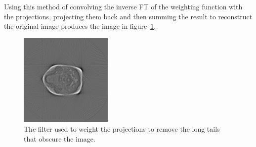         Using this method of convolving the inverse FT of the weighting function with the projections, projecting them back and then summing the result to reconstruct the original image produces the image in figure~\ref{fig:filtered_backprojection}.
        \begin{figure}[ht]
            \centering
                \includegraphics[width=0.4\textwidth]{Files/report_images/reconstructed_image.jpg}
            \caption{The filter used to weight the projections to remove the long tails that obscure the image.\label{fig:filtered_backprojection}}
        \end{figure}




